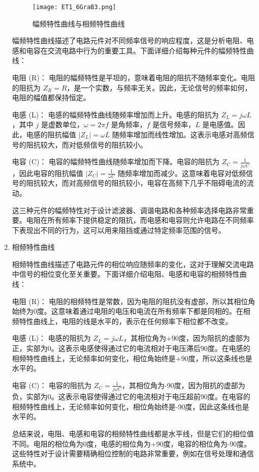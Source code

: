 \documentclass[dvipsnames, svgnames,a4paper,11pt]{article}
\begin{document}
\begin{enumerate}
		\begin{figure}[htbp]
			\centering
			\texttt{[image: ET1\_6GraB3.png]}
			\caption{幅频特性曲线与相频特性曲线}
			\label{fig:figB3}
		\end{figure}
		
		幅频特性曲线描述了电路元件对不同频率信号的响应程度，这是分析电阻、电感和电容在交流电路中行为的重要工具。下面详细介绍每种元件的幅频特性曲线：
		
		电阻 (R)：
		电阻的幅频特性是平坦的，意味着电阻的阻抗不随频率变化。电阻的阻抗为 \(Z_R = R\)，是一个实数，与频率无关。因此，无论信号的频率如何，电阻的幅值都保持恒定。
		
		电感 (L)：
		电感的幅频特性曲线随频率增加而上升。电感的阻抗为 \(Z_L = j\omega L\)，其中 \(j\) 是虚数单位，\(\omega = 2\pi f\) 是角频率，\(f\) 是信号频率，\(L\) 是电感值。因此，电感的阻抗幅值 \(|Z_L| = \omega L\) 随频率增加而线性增加。这表示电感对高频信号的阻抗较大，而对低频信号的阻抗较小。
		
		电容 (C)：
		电容的幅频特性曲线随频率增加而下降。电容的阻抗为 \(Z_C = \frac{1}{j\omega C}\)，因此电容的阻抗幅值 \(|Z_C| = \frac{1}{\omega C}\) 随频率增加而减少。这意味着电容对低频信号的阻抗较大，而对高频信号的阻抗较小，电容在高频下几乎不阻碍电流的流动。
		
		这三种元件的幅频特性对于设计滤波器、调谐电路和各种频率选择电路非常重要。电阻在所有频率下提供稳定的阻抗，而电感和电容则允许电路在不同频率下表现出不同的行为，这可以用来阻挡或通过特定频率范围的信号。
		
		\item 相频特性曲线
		
		相频特性曲线描述了电路元件的相位响应随频率的变化，这对于理解交流电路中信号的相位变化至关重要。下面详细介绍电阻、电感和电容的相频特性曲线：
		
		电阻 (R)：
		电阻的相频特性是常数，因为电阻的阻抗没有虚部，所以其相位角始终为0度。这意味着通过电阻的电压和电流在所有频率下都是同相的。在相频特性曲线上，电阻的线是水平的，表示在任何频率下相位都不改变。
		
		电感 (L)：
		电感的阻抗为 \(Z_L = j\omega L\)，其相位角为+90度，因为阻抗的虚部为正，实部为0。这表示电感使得通过它的电流相对于电压滞后90度。在电感的相频特性曲线上，无论频率如何变化，相位角始终是+90度，所以这条线也是水平的。
		
		电容 (C)：
		电容的阻抗为 \(Z_C = \frac{1}{j\omega C}\)，其相位角为-90度，因为阻抗的虚部为负，实部为0。这表示电容使得通过它的电流相对于电压超前90度。在电容的相频特性曲线上，无论频率如何变化，相位角始终是-90度，因此这条线也是水平的。
		
		总结来说，电阻、电感和电容的相频特性曲线都是水平线，但是它们的相位值不同。电阻的相位角为0度，电感的相位角为+90度，电容的相位角为-90度。这些特性对于设计需要精确相位控制的电路非常重要，例如在信号处理和通信系统中。	

	\end{enumerate}
	
\end{document}
